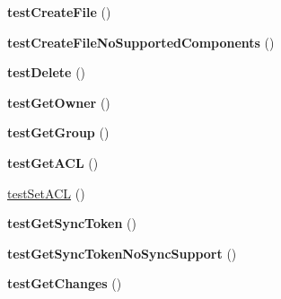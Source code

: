 \begin{DoxyCompactItemize}
{\bfseries test\+Create\+File} ()
\item 
\mbox{\label{class_sabre_1_1_cal_d_a_v_1_1_calendar_test_a436b9935ae14b48c7e23cf4508d1500b}} 
{\bfseries test\+Create\+File\+No\+Supported\+Components} ()
\item 
\mbox{\label{class_sabre_1_1_cal_d_a_v_1_1_calendar_test_ae8e69a7c7bc2062e7042040e97ebf4e0}} 
{\bfseries test\+Delete} ()
\item 
\mbox{\label{class_sabre_1_1_cal_d_a_v_1_1_calendar_test_a56005ad437e2619b0178996740f0f7cb}} 
{\bfseries test\+Get\+Owner} ()
\item 
\mbox{\label{class_sabre_1_1_cal_d_a_v_1_1_calendar_test_a24d2d8e54c972639c05bc2f0c880167e}} 
{\bfseries test\+Get\+Group} ()
\item 
\mbox{\label{class_sabre_1_1_cal_d_a_v_1_1_calendar_test_ad27a216784b3a8c3394a7a6437f8aeeb}} 
{\bfseries test\+Get\+A\+CL} ()
\item 
\mbox{\hyperlink{class_sabre_1_1_cal_d_a_v_1_1_calendar_test_a9236b3deae90ff92a30c1e4e456a5c03}{test\+Set\+A\+CL}} ()
\item 
\mbox{\label{class_sabre_1_1_cal_d_a_v_1_1_calendar_test_ab111cea89f0d167a480458138c28df63}} 
{\bfseries test\+Get\+Sync\+Token} ()
\item 
\mbox{\label{class_sabre_1_1_cal_d_a_v_1_1_calendar_test_a3d63db318bd3818f74e256a917e2c361}} 
{\bfseries test\+Get\+Sync\+Token\+No\+Sync\+Support} ()
\item 
\mbox{\label{class_sabre_1_1_cal_d_a_v_1_1_calendar_test_aa53acfe0bfd3ec38eda088c11adeb7f5}} 
{\bfseries test\+Get\+Changes} ()
\end{DoxyCompactItemize}
